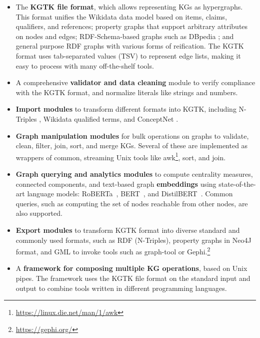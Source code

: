 \documentclass[runningheads]{llncs}
\newcommand{\kibitz}[2]{%
{\color{#1}#2}{}%
}
\newcommand{\filip}[1]{\kibitz{purple}{[FI:#1]}} %
\newcommand{\DG}[1]{\kibitz{red}{[DG: #1]}} %
\begin{document}
\begin{itemize}
\item The \textbf{KGTK file format}, which allows representing KGs as hypergraphs. This format unifies the Wikidata data model \cite{vrandecic_wikidata:_2014} based on items, claims, qualifiers, and references; property graphs that support arbitrary attributes on nodes and edges; RDF-Schema-based graphs such as DBpedia \cite{dbpedia}; and general purpose RDF graphs with various forms of reification. The KGTK format uses tab-separated values (TSV) to represent edge lists, making it easy to process with many off-the-shelf tools.

\item A comprehensive \textbf{validator and data cleaning} module to verify compliance with the KGTK format, and normalize literals like strings and numbers.%
\item \textbf{Import modules} to transform different formats into KGTK, including N-Triples \cite{Seaborne:14:RN}, Wikidata qualified terms, and ConceptNet \cite{speer2016conceptnet}.%
\item \textbf{Graph manipulation modules} for bulk operations on graphs to validate, clean, filter, join, sort, and merge KGs. Several of these are implemented as wrappers of common, streaming Unix tools like awk\footnote{\url{https://linux.die.net/man/1/awk}}, sort, and join. %
\item \textbf{Graph querying and analytics modules} to compute centrality measures, connected components, and text-based graph \textbf{embeddings} using state-of-the-art language models: RoBERTa~\cite{liu2019roberta}, BERT~\cite{devlin2018bert}, and DistilBERT~\cite{sanh2019distilbert}. Common queries, such as computing the set of nodes reachable from other nodes, are also supported.
\item \textbf{Export modules} to transform KGTK format into diverse standard and commonly used formats, such as RDF (N-Triples), property graphs in Neo4J format, and GML to invoke tools such as graph-tool or Gephi.\footnote{\url{https://gephi.org/}}  
\item A \textbf{framework for composing multiple KG operations}, based on Unix pipes. The framework uses the KGTK file format on the standard input and output to combine tools written in different programming languages.%
\end{itemize}
\end{document}
